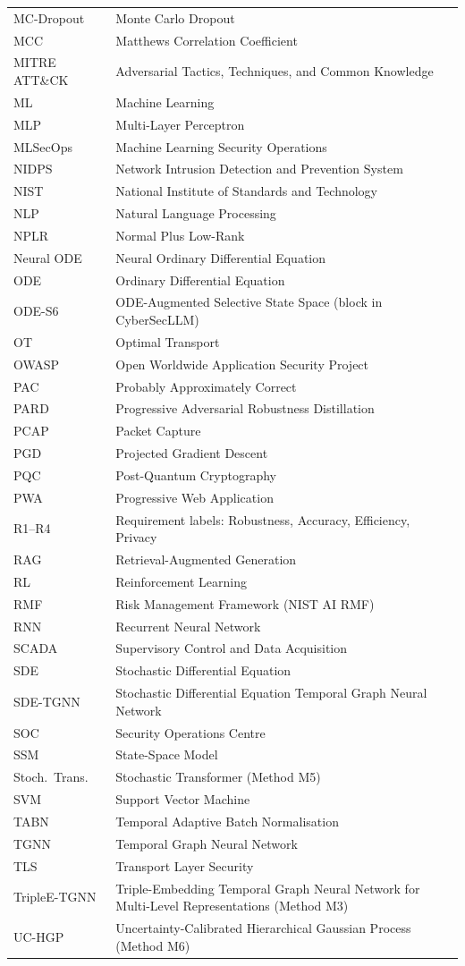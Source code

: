 \begin{longtable}{@{}p{3.8cm} p{10cm}@{}}
MC-Dropout & Monte Carlo Dropout \\
MCC & Matthews Correlation Coefficient \\
MITRE ATT\&CK & Adversarial Tactics, Techniques, and Common Knowledge \\
ML & Machine Learning \\
MLP & Multi-Layer Perceptron \\
MLSecOps & Machine Learning Security Operations \\
NIDPS & Network Intrusion Detection and Prevention System \\
NIST & National Institute of Standards and Technology \\
NLP & Natural Language Processing \\
NPLR & Normal Plus Low-Rank \\
Neural ODE & Neural Ordinary Differential Equation \\
ODE & Ordinary Differential Equation \\
ODE-S6 & ODE-Augmented Selective State Space (block in CyberSecLLM) \\
OT & Optimal Transport \\
OWASP & Open Worldwide Application Security Project \\
PAC & Probably Approximately Correct \\
PARD & Progressive Adversarial Robustness Distillation \\
PCAP & Packet Capture \\
PGD & Projected Gradient Descent \\
PQC & Post-Quantum Cryptography \\
PWA & Progressive Web Application \\
R1--R4 & Requirement labels: Robustness, Accuracy, Efficiency, Privacy \\
RAG & Retrieval-Augmented Generation \\
RL & Reinforcement Learning \\
RMF & Risk Management Framework (NIST AI RMF) \\
RNN & Recurrent Neural Network \\
SCADA & Supervisory Control and Data Acquisition \\
SDE & Stochastic Differential Equation \\
SDE-TGNN & Stochastic Differential Equation Temporal Graph Neural Network \\
SOC & Security Operations Centre \\
SSM & State-Space Model \\
Stoch.\ Trans. & Stochastic Transformer (Method M5) \\
SVM & Support Vector Machine \\
TABN & Temporal Adaptive Batch Normalisation \\
TGNN & Temporal Graph Neural Network \\
TLS & Transport Layer Security \\
TripleE-TGNN & Triple-Embedding Temporal Graph Neural Network for Multi-Level Representations (Method M3) \\
UC-HGP & Uncertainty-Calibrated Hierarchical Gaussian Process (Method M6) \\
\end{longtable}
